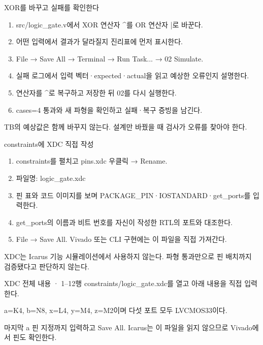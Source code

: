 \begin{frame}{XOR를 바꾸고 실패를 확인한다}\relax
\small
\begin{enumerate}\setlength{\itemsep}{0.22cm}
\item src/logic\_gate.v에서 XOR 연산자 \textasciicircum{}를 OR 연산자 |로 바꾼다.
\item 어떤 입력에서 결과가 달라질지 진리표에 먼저 표시한다.
\item File → Save All → Terminal → Run Task... → 02 Simulate.
\item 실패 로그에서 입력 벡터·expected·actual을 읽고 예상한 오류인지 설명한다.
\item 연산자를 \textasciicircum{}로 복구하고 저장한 뒤 02를 다시 실행한다.
\item cases=4 통과와 새 파형을 확인하고 실패·복구 증빙을 남긴다.
\end{enumerate}
TB의 예상값은 함께 바꾸지 않는다. 설계만 바꿨을 때 검사가 오류를 찾아야 한다.\par
\end{frame}

\begin{frame}{constraints에 XDC 직접 작성}\relax
\small
\begin{enumerate}\setlength{\itemsep}{0.22cm}
\item constraints를 펼치고 pins.xdc 우클릭 → Rename.
\item 파일명: logic\_gate.xdc
\item 핀 표와 코드 이미지를 보며 PACKAGE\_PIN·IOSTANDARD·get\_ports를 입력한다.
\item get\_ports의 이름과 비트 번호를 자신이 작성한 RTL의 포트와 대조한다.
\item File → Save All. Vivado 또는 CLI 구현에는 이 파일을 직접 가져간다.
\end{enumerate}
XDC는 Icarus 기능 시뮬레이션에서 사용하지 않는다. 파형 통과만으로 핀 배치까지 검증됐다고 판단하지 않는다.\par
\end{frame}

\begin{frame}{XDC 전체 내용 · 1--12행}\relax
\small
constraints/logic\_gate.xdc를 열고 아래 내용을 직접 입력한다.\par{}a=K4, b=N8, x=L4, y=M4, z=M2이며 다섯 포트 모두 LVCMOS33이다.\par\vspace{0.22cm}마지막 a 핀 지정까지 입력하고 Save All. Icarus는 이 파일을 읽지 않으므로 Vivado에서 핀도 확인한다.\par
\end{frame}
